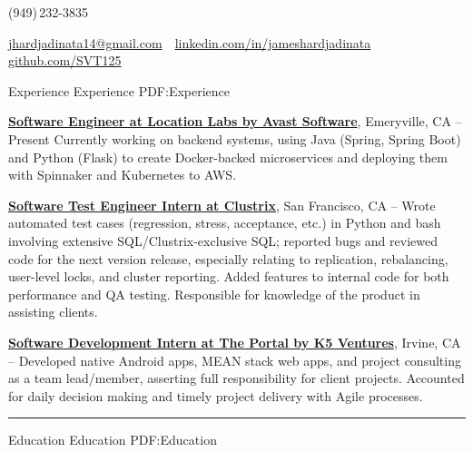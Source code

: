 \documentclass[letterpaper,MMMyyyy,nonstopmode]{simpleresumecv}
\makeatletter
\newcommand{\ResumeAuthor}{James Hardjadinata}
\newcommand{\ResumeWebsite}{github.com/SVT125}
\newcommand{\ResumeLinkedin}{linkedin.com/in/jameshardjadinata}
\newcommand{\ResumeEmail}{jhardjadinata14@gmail.com}
\makeatother
\begin{document}

\Title{\ResumeAuthor}
\begin{SubTitle}
(949)\,232-3835
\par
\href{mailto:\ResumeEmail}
{\ResumeEmail}
\,\textbullet\,
\href{\ResumeLinkedin}
{\url{\ResumeLinkedin}}\,
\,\textbullet\,
\href{\ResumeWebsite}
{\url{\ResumeWebsite}}
\end{SubTitle}

\begin{Body}


\Section
{Experience}
{Experience}
{PDF:Experience}

\Entry
\href{https://www.locationlabs.com/}
{\textbf{Software Engineer at Location Labs by Avast Software}},
Emeryville, CA
\hfill
{} --
Present
\Gap
Currently working on backend systems, using Java (Spring, Spring Boot) and Python (Flask) to create Docker-backed microservices and deploying them with Spinnaker and Kubernetes to AWS.
\newline

\Entry
\href{http://www.clustrix.com/}
{\textbf{Software Test Engineer Intern at Clustrix}},
San Francisco, CA
\hfill
{} --
\Gap
Wrote automated test cases (regression, stress, acceptance, etc.) in Python and bash involving extensive SQL/Clustrix-exclusive
SQL; reported bugs and reviewed code for the next version release, especially relating to replication, rebalancing, user-level locks, and cluster reporting. Added features to internal code for both performance and QA
testing. Responsible for knowledge of the product in assisting clients.\newline

\Entry
\href{http://www.theportal.io/}
{\textbf{Software Development Intern at The Portal by K5 Ventures}},
Irvine, CA
\hfill
{} --
\Gap
Developed native Android apps, MEAN stack web apps, and project consulting as a team lead/member, asserting full
responsibility for client projects. Accounted for daily decision making and timely project delivery with Agile processes.\newline

\hrule


\Section
{Education}
{Education}
{PDF:Education}


\end{Body}
\end{document}

